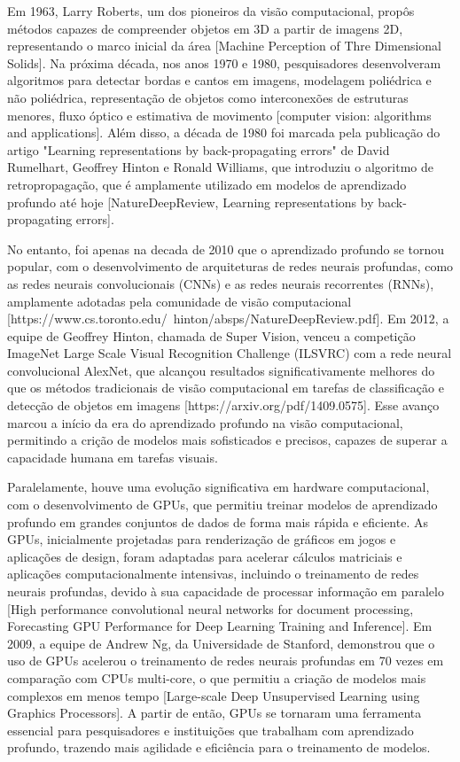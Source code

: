 Em 1963, Larry Roberts, um dos pioneiros da visão computacional, propôs métodos capazes de compreender objetos em 3D a partir de imagens 2D, representando o marco inicial da área [Machine Perception of Thre Dimensional Solids]. Na próxima década, nos anos 1970 e 1980, pesquisadores desenvolveram algoritmos para detectar bordas e cantos em imagens, modelagem poliédrica e não poliédrica, representação de objetos como interconexões de estruturas menores, fluxo óptico e estimativa de movimento [computer vision: algorithms and applications]. Além disso, a década de 1980 foi marcada pela publicação do artigo "Learning representations by back-propagating errors" de David Rumelhart, Geoffrey Hinton e Ronald Williams, que introduziu o algoritmo de retropropagação, que é amplamente utilizado em modelos de aprendizado profundo até hoje [NatureDeepReview, Learning representations by back-propagating errors].

No entanto, foi apenas na decada de 2010 que o aprendizado profundo se tornou popular, com o desenvolvimento de arquiteturas de redes neurais profundas, como as redes neurais convolucionais (CNNs) e as redes neurais recorrentes (RNNs), amplamente adotadas pela comunidade de visão computacional [https://www.cs.toronto.edu/~hinton/absps/NatureDeepReview.pdf]. Em 2012, a equipe de Geoffrey Hinton, chamada de Super Vision, venceu a competição ImageNet Large Scale Visual Recognition Challenge (ILSVRC) com a rede neural convolucional AlexNet, que alcançou resultados significativamente melhores do que os métodos tradicionais de visão computacional em tarefas de classificação e detecção de objetos em imagens [https://arxiv.org/pdf/1409.0575]. Esse avanço marcou a início da era do aprendizado profundo na visão computacional, permitindo a crição de modelos mais sofisticados e precisos, capazes de superar a capacidade humana em tarefas visuais.

Paralelamente, houve uma evolução significativa em hardware computacional, com o desenvolvimento de GPUs, que permitiu treinar modelos de aprendizado profundo em grandes conjuntos de dados de forma mais rápida e eficiente. As GPUs, inicialmente projetadas para renderização de gráficos em jogos e aplicações de design, foram adaptadas para acelerar cálculos matriciais e aplicações computacionalmente intensivas, incluindo o treinamento de redes neurais profundas, devido à sua capacidade de processar informação em paralelo [High performance convolutional neural networks for document processing, Forecasting GPU Performance for Deep Learning Training and Inference]. Em 2009, a equipe de Andrew Ng, da Universidade de Stanford, demonstrou que o uso de GPUs acelerou o treinamento de redes neurais profundas em 70 vezes em comparação com CPUs multi-core, o que permitiu a criação de modelos mais complexos em menos tempo [Large-scale Deep Unsupervised Learning using Graphics Processors]. A partir de então, GPUs se tornaram uma ferramenta essencial para pesquisadores e instituições que trabalham com aprendizado profundo, trazendo mais agilidade e eficiência para o treinamento de modelos.

